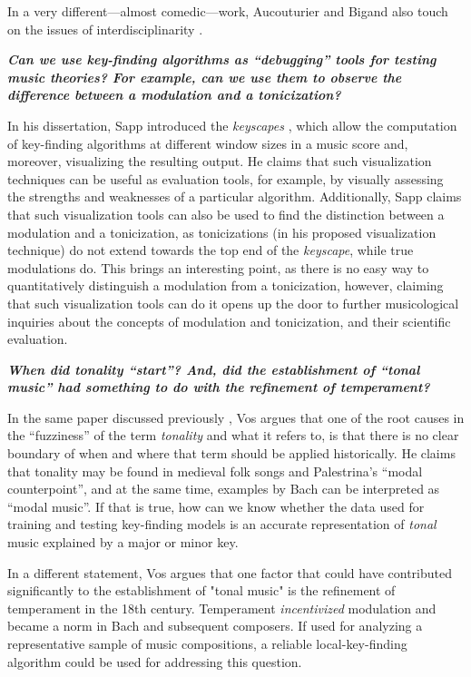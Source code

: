 In a very different---almost comedic---work, Aucouturier and Bigand also touch on the issues of interdisciplinarity \cite{aucouturier2012mel}.

\textbf{\emph{Can we use key-finding algorithms as ``debugging'' tools for testing music theories? For example, can we use them to observe the difference between a modulation and a tonicization?}}

In his dissertation, Sapp introduced the \emph{keyscapes} \cite{sapp2011computational}, which allow the computation of key-finding algorithms at different window sizes in a music score and, moreover, visualizing the resulting output. He claims that such visualization techniques can be useful as evaluation tools, for example, by visually assessing the strengths and weaknesses of a particular algorithm. Additionally, Sapp claims that such visualization tools can also be used to find the distinction between a modulation and a tonicization, as tonicizations (in his proposed visualization technique) do not extend towards the top end of the \emph{keyscape}, while true modulations do. This brings an interesting point, as there is no easy way to quantitatively distinguish a modulation from a tonicization, however, claiming that such visualization tools can do it opens up the door to further musicological inquiries about the concepts of modulation and tonicization, and their scientific evaluation. 


\textbf{\emph{When did tonality ``start''? And, did the establishment of ``tonal music'' had something to do with the refinement of temperament?}}

In the same paper discussed previously \cite{vos2000tonality}, Vos argues that one of the root causes in the ``fuzziness'' of the term \emph{tonality} and what it refers to, is that there is no clear boundary of when and where that term should be applied historically. He claims that tonality may be found in medieval folk songs and Palestrina's ``modal counterpoint'', and at the same time, examples by Bach can be interpreted as ``modal music''. If that is true, how can we know whether the data used for training and testing key-finding models is an accurate representation of \emph{tonal} music explained by a major or minor key.

In a different statement, Vos argues that one factor that could have contributed significantly to the establishment of "tonal music" is the refinement of temperament in the 18th century. Temperament \emph{incentivized} modulation and became a norm in Bach and subsequent composers. If used for analyzing a representative sample of music compositions, a reliable local-key-finding algorithm could be used for addressing this question.

